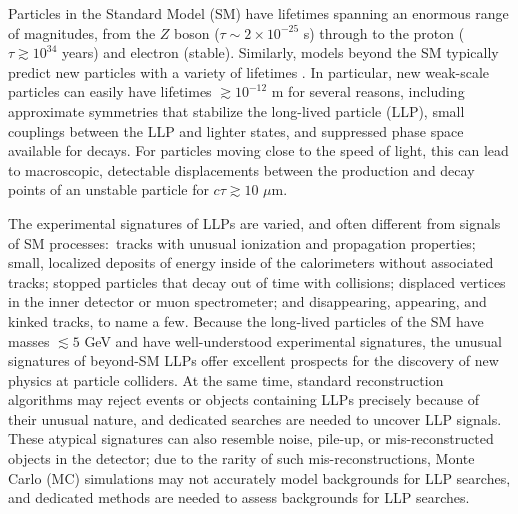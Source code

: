 
\noindent Particles in the Standard Model (SM) have lifetimes spanning an enormous range of magnitudes, from the $Z$ boson ($\tau\sim2\times10^{-25}$ s) through to the proton ($\tau\gtrsim10^{34}$ years) and electron (stable). Similarly, models beyond the SM typically predict new particles with a variety of lifetimes \cite{massive-cite-dump}. In particular, new weak-scale particles can easily have lifetimes $\gtrsim10^{-12}$ m for several reasons, including approximate symmetries that stabilize the long-lived particle (LLP), small couplings between the LLP and lighter states, and suppressed phase space available for decays. For particles moving close to the speed of light, this can lead to macroscopic, detectable displacements between the production and decay points of an unstable particle for $c\tau\gtrsim 10\,\,\mu\mathrm{m}$.

The experimental signatures of LLPs are varied, and often different from signals of SM processes:~tracks with unusual ionization and propagation properties; small, localized deposits of energy inside of the calorimeters without associated tracks; stopped particles that decay out of time with collisions; displaced vertices in the inner detector or muon spectrometer; and disappearing, appearing, and kinked tracks, to name a few. Because the long-lived particles of the SM have masses $\lesssim5$ GeV and have well-understood experimental signatures, the unusual signatures of beyond-SM LLPs offer excellent prospects for the discovery of new physics at particle colliders. At the same time, standard reconstruction algorithms may reject events or objects containing LLPs precisely because of their unusual nature, and dedicated searches are needed to uncover LLP signals. These atypical signatures can also resemble noise, pile-up, or mis-reconstructed objects in the detector; due to the rarity of such mis-reconstructions, Monte Carlo (MC) simulations may not accurately model backgrounds for LLP searches, and dedicated methods are needed to assess backgrounds for LLP searches.

